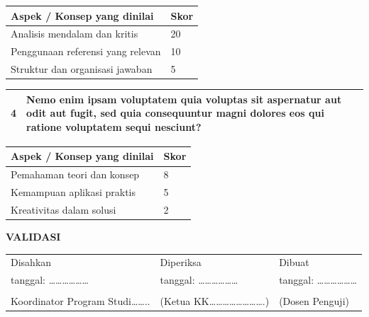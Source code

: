 \documentclass[12pt,a4paper]{article}
\renewcommand{\arraystretch}{1.0}
\begin{document}
\noindent
\renewcommand{\arraystretch}{1.2}
\begin{tabular}{|p{12cm}|p{3cm}|}
\hline
\textbf{Aspek / Konsep yang dinilai} & \textbf{Skor} \\
\hline
Analisis mendalam dan kritis & 20 \\
\hline
Penggunaan referensi yang relevan & 10 \\
\hline
Struktur dan organisasi jawaban & 5 \\
\hline
\end{tabular}

\vspace{0.5cm}

\noindent
\renewcommand{\arraystretch}{1.2}
\begin{tabular}{|>{\centering}m{2cm}|p{13cm}|}
\hline
\textbf{4} & Nemo enim ipsam voluptatem quia voluptas sit aspernatur aut odit aut fugit, sed quia consequuntur magni dolores eos qui ratione voluptatem sequi nesciunt? \\
\hline
\end{tabular}

\noindent
\renewcommand{\arraystretch}{1.2}
\begin{tabular}{|p{12cm}|p{3cm}|}
\hline
\textbf{Aspek / Konsep yang dinilai} & \textbf{Skor} \\
\hline
Pemahaman teori dan konsep & 8 \\
\hline
Kemampuan aplikasi praktis & 5 \\
\hline
Kreativitas dalam solusi & 2 \\
\hline
\end{tabular}

\vspace{1cm}

\begin{center}
\textbf{VALIDASI}
\end{center}

\vspace{0.5cm}

\noindent
\renewcommand{\arraystretch}{1.0}
\begin{tabular}{|>{\centering}p{4.8cm}|>{\centering}p{4.8cm}|>{\centering\arraybackslash}p{4.8cm}|}
\hline
Disahkan & Diperiksa & Dibuat \\
tanggal: ……………… & tanggal: ……………… & tanggal: ……………… \\
\hline
& & \\[3cm]
\hline
Koordinator Program Studi…….. & (Ketua KK…………………….) & (Dosen Penguji) \\
\hline
\end{tabular}
\end{document}
